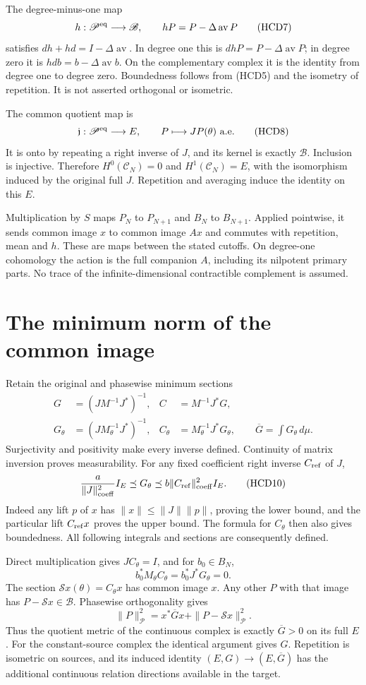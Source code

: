 \documentclass[11pt]{article}
\newcommand{\av}{\operatorname{av}}
\begin{document}
The degree-minus-one map
\[
 h:\mathscr P^{\rm eq}\longrightarrow\mathscr B,\qquad
 hP=P-\Delta\av P
 \tag{HCD7}
\]
satisfies $dh+hd=I-\Delta\av$. In degree one this is
$dhP=P-\Delta\av P$; in degree zero it is
$hd b=b-\Delta\av b$. On the complementary complex it
is the identity from degree one to degree zero. Boundedness
follows from (HCD5) and the isometry of repetition.
It is not asserted orthogonal or isometric.

The common quotient map is
\[
 \mathfrak j:\mathscr P^{\rm eq}\longrightarrow E,\qquad
 P\longmapsto JP(\theta)\text{ a.e.}
 \tag{HCD8}
\]
It is onto by repeating a right inverse of $J$, and its
kernel is exactly $\mathscr B$. Inclusion is injective.
Therefore $H^0(\mathscr C_N)=0$ and $H^1(\mathscr C_N)=E$,
with the isomorphism induced by the original full $J$.
Repetition and averaging induce the identity on this $E$.

Multiplication by $S$ maps $P_N$ to $P_{N+1}$ and $B_N$
to $B_{N+1}$. Applied pointwise, it sends common image $x$
to common image $Ax$ and commutes with repetition, mean
and $h$. These are maps between the stated cutoffs.
On degree-one cohomology the action is the full companion
$A$, including its nilpotent primary parts. No trace of
the infinite-dimensional contractible complement is assumed.

\section{The minimum norm of the common image}

Retain the original and phasewise minimum sections
\[
 \begin{split}
 G&=(JM^{-1}J^*)^{-1},& C&=M^{-1}J^*G,\\
 G_\theta&=(JM_\theta^{-1}J^*)^{-1},&
 C_\theta&=M_\theta^{-1}J^*G_\theta,\qquad
 \overline G=\int G_\theta\,d\mu.
 \end{split}
 \tag{HCD9}
\]
Surjectivity and positivity make every inverse defined.
Continuity of matrix inversion proves measurability.
For any fixed coefficient right inverse $C_{\rm ref}$ of $J$,
\[
 \frac{a}{\|J\|_{\rm coeff}^2}I_E
 \preceq G_\theta
 \preceq b\|C_{\rm ref}\|_{\rm coeff}^2I_E.
 \tag{HCD10}
\]
Indeed any lift $p$ of $x$ has
$\|x\|\le\|J\|\|p\|$, proving the lower bound, and the
particular lift $C_{\rm ref}x$ proves the upper bound.
The formula for $C_\theta$ then also gives boundedness.
All following integrals and sections are consequently defined.

Direct multiplication gives $JC_\theta=I$, and for $b_0\in B_N$,
\[
 b_0^*M_\theta C_\theta=b_0^*J^*G_\theta=0.
 \tag{HCD11}
\]
The section $\mathscr Sx(\theta)=C_\theta x$ has common image
$x$. Any other $P$ with that image has
$P-\mathscr Sx\in\mathscr B$. Phasewise orthogonality gives
\[
 \|P\|_{\mathscr P}^2
 =x^*\overline Gx+\|P-\mathscr Sx\|_{\mathscr P}^2.
 \tag{HCD12}
\]
Thus the quotient metric of the continuous complex is exactly
$\overline G>0$ on its full $E$. For the constant-source
complex the identical argument gives $G$. Repetition is
isometric on sources, and its induced identity
$(E,G)\to(E,\overline G)$ has the additional continuous
relation directions available in the target.
\end{document}
